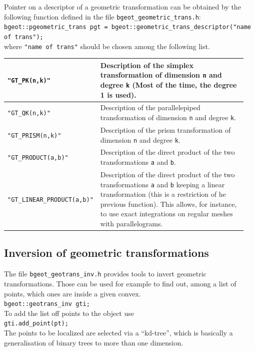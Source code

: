 \documentclass[11pt,a4paper]{article}
\begin{document}
Pointer on a descriptor of a geometric transformation can be obtained by the following function defined in the file {\tt bgeot\_geometric\_trans.h}:\\[0.5cm]
{\tt bgeot::pgeometric\_trans pgt = bgeot::geometric\_trans\_descriptor("name of trans"); }\\[0.5cm]
where {\tt "name of trans"} should be chosen among the following list.
\begin{center} \begin{tabular}{|m{0.3\linewidth}|m{0.65\linewidth}|} \hline
{\tt "GT\_PK(n,k)"} & Description of the simplex transformation of dimension {\tt n} and degree {\tt k} (Most of the time, the degree 1 is used).\\ \hline
{\tt "GT\_QK(n,k)"} & Description of the parallelepiped transformation of dimension {\tt n} and degree {\tt k}.\\ \hline
{\tt "GT\_PRISM(n,k)"} & Description of the prism transformation of dimension {\tt n} and degree {\tt k}. \\ \hline
{\tt "GT\_PRODUCT(a,b)"} & Description of the direct product of the two transformations {\tt a} and {\tt b}.\\ \hline
{\tt "GT\_LINEAR\_PRODUCT(a,b)"} & Description of the direct product of the two transformations {\tt a} and {\tt b} keeping a linear transformation (this is a restriction of he previous function). This allows, for instance, to use exact integrations on regular meshes with parallelograms.\\ \hline
\end{tabular} \end{center}

\subsection{Inversion of geometric transformations}
The file {\tt bgeot\_geotrans\_inv.h} provides tools to invert geometric transformations. Those can be used for example to find out, among a list of points, which ones are inside a given convex.\\[0.5cm]
{\tt bgeot::geotrans\_inv gti; }\\[0.5cm]
To add the list off points to the object use\\[0.5cm]
{\tt gti.add\_point(pt);  }\\[0.5cm]
The points to be localized are selected via a ``kd-tree'', which is basically a generalisation of binary trees to more than one dimension.
\end{document}
